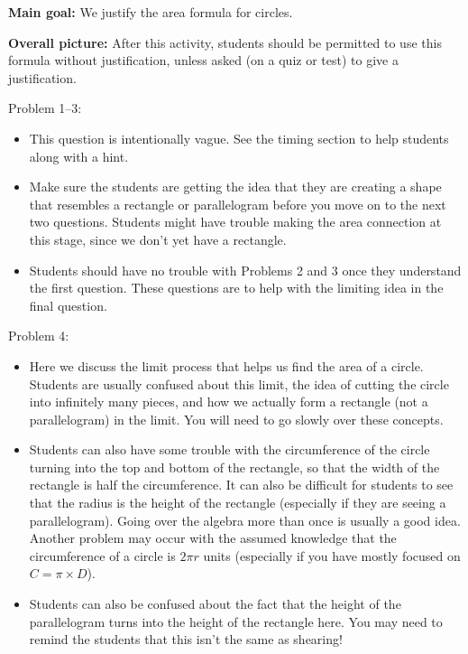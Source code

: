 \documentclass[nooutcomes,noauthor, handout]{ximera}
\begin{document}
\begin{instructorNotes}
{\bf Main goal:} We justify the area formula for circles.  


{\bf Overall picture:} After this activity, students should be permitted to use this formula without justification, unless asked (on a quiz or test) to give a justification.  

Problem 1--3: 
\begin{itemize}
\item This question is intentionally vague.  See the timing section to help students along with a hint.

\item Make sure the students are getting the idea that they are creating a shape that resembles a rectangle or parallelogram before you move on to the next two questions.  Students might have trouble making the area connection at this stage, since we don't yet have a rectangle.

\item Students should have no trouble with Problems 2 and 3 once they understand the first question.  These questions are to help with the limiting idea in the final question.

\end{itemize}

Problem 4:
\begin{itemize}
\item Here we discuss the limit process that helps us find the area of a circle.  Students are usually confused about this limit, the idea of cutting the circle into infinitely many pieces, and how we actually form a rectangle (not a parallelogram) in the limit.  You will need to go slowly over these concepts.


\item Students can also have some trouble with the circumference of the circle turning into the top and bottom of the rectangle, so that the width of the rectangle is half the circumference.  It can also be difficult for students to see that the radius is the height of the rectangle (especially if they are seeing a parallelogram).  Going over the algebra more than once is usually a good idea.  Another problem may occur with the assumed knowledge that the circumference of a circle is $2\pi r$  units (especially if you have mostly focused on $C = \pi \times D$).  

\item Students can also be confused about the fact that the height of the parallelogram turns into the height of the rectangle here. You may need to remind the students that this isn't the same as shearing!


\end{itemize}
\end{instructorNotes}
\end{document}

